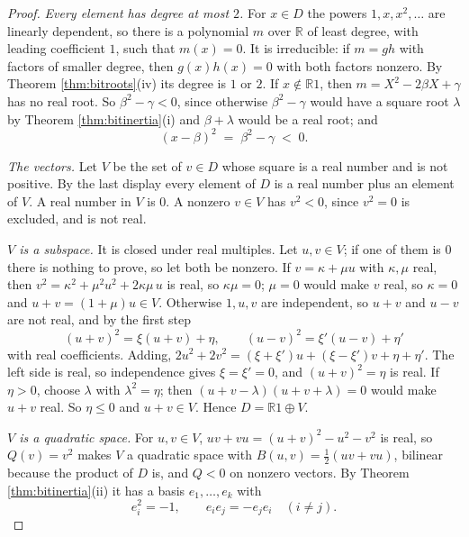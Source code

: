 \documentclass[11pt]{article}
\theoremstyle{plain}
\theoremstyle{definition}
\theoremstyle{plain}
\theoremstyle{definition}
\newcommand{\R}{\mathbb{R}}
\begin{document}
\begin{proof}
\emph{Every element has degree at most $2$.} For $x \in D$ the powers $1, x, x^{2}, \dots$ are linearly dependent, so there is a polynomial $m$ over $\R$ of least degree, with leading coefficient $1$, such that $m(x) = 0$. It is irreducible: if $m = gh$ with factors of smaller degree, then $g(x)h(x) = 0$ with both factors nonzero. By Theorem \ref{thm:bitroots}(iv) its degree is $1$ or $2$. If $x \notin \R 1$, then $m = X^{2} - 2\beta X + \gamma$ has no real root. So $\beta^{2} - \gamma < 0$, since otherwise $\beta^{2} - \gamma$ would have a square root $\lambda$ by Theorem \ref{thm:bitinertia}(i) and $\beta + \lambda$ would be a real root; and
\[
(x - \beta)^{2} \;=\; \beta^{2} - \gamma \;<\; 0 .
\]

\emph{The vectors.} Let $V$ be the set of $v \in D$ whose square is a real number and is not positive. By the last display every element of $D$ is a real number plus an element of $V$. A real number in $V$ is $0$. A nonzero $v \in V$ has $v^{2} < 0$, since $v^{2} = 0$ is excluded, and is not real.

\emph{$V$ is a subspace.} It is closed under real multiples. Let $u, v \in V$; if one of them is $0$ there is nothing to prove, so let both be nonzero. If $v = \kappa + \mu u$ with $\kappa, \mu$ real, then $v^{2} = \kappa^{2} + \mu^{2}u^{2} + 2\kappa\mu\,u$ is real, so $\kappa\mu = 0$; $\mu = 0$ would make $v$ real, so $\kappa = 0$ and $u + v = (1 + \mu)u \in V$. Otherwise $1, u, v$ are independent, so $u + v$ and $u - v$ are not real, and by the first step
\[
(u + v)^{2} = \xi(u + v) + \eta, \qquad (u - v)^{2} = \xi'(u - v) + \eta'
\]
with real coefficients. Adding, $2u^{2} + 2v^{2} = (\xi + \xi')u + (\xi - \xi')v + \eta + \eta'$. The left side is real, so independence gives $\xi = \xi' = 0$, and $(u + v)^{2} = \eta$ is real. If $\eta > 0$, choose $\lambda$ with $\lambda^{2} = \eta$; then $(u + v - \lambda)(u + v + \lambda) = 0$ would make $u + v$ real. So $\eta \leq 0$ and $u + v \in V$. Hence $D = \R 1 \oplus V$.

\emph{$V$ is a quadratic space.} For $u, v \in V$, $uv + vu = (u+v)^{2} - u^{2} - v^{2}$ is real, so $Q(v) = v^{2}$ makes $V$ a quadratic space with $B(u,v) = \tfrac12(uv + vu)$, bilinear because the product of $D$ is, and $Q < 0$ on nonzero vectors. By Theorem \ref{thm:bitinertia}(ii) it has a basis $e_{1}, \dots, e_{k}$ with
\[
e_{i}^{2} = -1, \qquad e_{i}e_{j} = -e_{j}e_{i} \quad (i \neq j).
\]


\end{proof}
\end{document}

